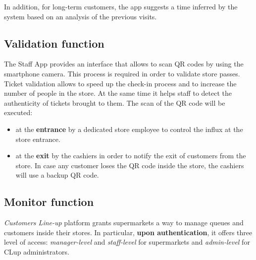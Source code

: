 	In addition, for long-term customers, the app suggests a time inferred by the system based on an analysis of the previous visits.

\subsection{Validation function}
The Staff App provides an interface that allows to scan QR codes by using the smartphone camera. This process is required in order to validate store passes.\newline
Ticket validation allows to speed up the check-in process and to increase the number of people in the store. At the same time it helps staff to detect the authenticity of tickets brought to them.\newline
The scan of the QR code will be executed:
\begin{itemize}
	\item at the \textbf{entrance} by a dedicated store employee to control the influx at the store entrance.
	\item at the \textbf{exit} by the cashiers in order to notify the exit of customers from the store. In case any customer loses the QR code inside the store, the cashiers will use a backup QR code.
\end{itemize}

\subsection{Monitor function}
\textit{Customers Line-up} platform grants supermarkets a way to manage queues and customers inside their stores. In particular, \textbf{upon authentication}, it offers three level of access: \textit{manager-level} and \textit{staff-level} for supermarkets and \textit{admin-level} for CLup administrators.

